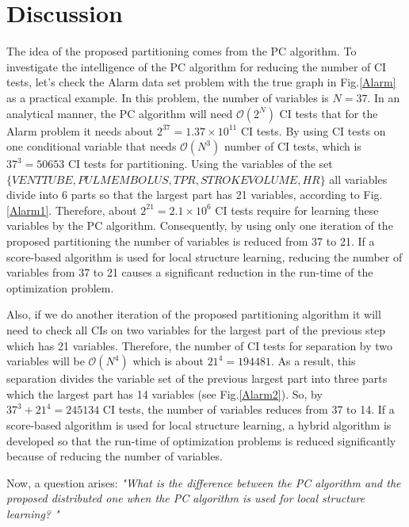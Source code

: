 \documentclass{article}
\newcommand{\Oo}{\mathcal{O}}
\begin{document}
\section{Discussion}
The idea of the proposed partitioning comes from the PC algorithm.
To investigate the intelligence of the PC algorithm for reducing the number of CI tests, let's check the Alarm data set problem with the true graph in Fig.\ref{Alarm} as a practical example.
In this problem, the number of variables is $N=37$. In an analytical manner, the PC algorithm will need $\Oo(2^N)$ CI tests that for the Alarm problem it needs about $2^{37}=1.37\times 10^{11}$ CI tests.
By using CI tests on one conditional variable that needs $\Oo(N^3)$ number of CI tests, which is $37^3=50653$ CI tests for partitioning. Using the variables of the set $\{VENTTUBE, PULMEMBOLUS, TPR, STROKEVOLUME, HR \}$ all variables divide into 6 parts so that the largest part has 21 variables, according to Fig.\ref{Alarm1}. Therefore, about $2^{21}=2.1\times 10^6$ CI tests require for learning these variables by the PC algorithm. Consequently, by using only one iteration of the proposed partitioning the number of variables is reduced from 37 to 21. If a score-based algorithm is used for local structure learning, reducing the number of variables from 37 to 21 causes a significant reduction in the run-time of the optimization problem. 

Also, if we do another iteration of the proposed partitioning algorithm it will need to check all CIs on two variables for the largest part of the previous step which has 21 variables. Therefore, the number of CI tests for separation by two variables will be $\Oo(N^4)$ which is about $21^4=194481$.
As a result, this separation divides the variable set of the previous largest part into three parts which the largest part has 14 variables (see Fig.\ref{Alarm2}).
So, by $37^3+21^4 = 245134$ CI tests, the number of variables reduces from 37 to 14.
If a score-based algorithm is used for local structure learning, a hybrid algorithm is developed so that the run-time of optimization problems is reduced significantly because of reducing the number of variables.

Now, a question arises: \emph{"What is the difference between the PC algorithm and the proposed distributed one when the PC algorithm is used for local structure learning? "} 
\end{document}
